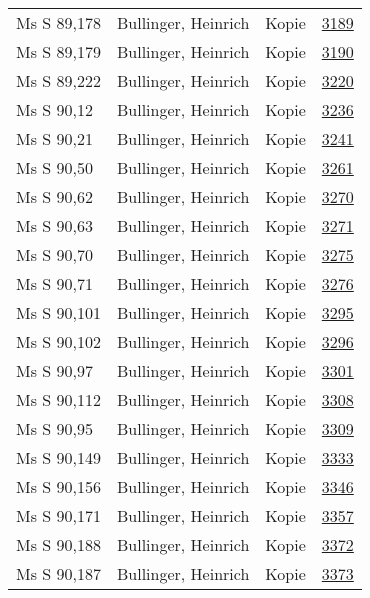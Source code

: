 \documentclass[10pt,a4paper,landscape]{report}
\begin{document}
\begin{longtable}{p{16cm}p{4cm}lr}
Ms S 89,178	&	Bullinger, Heinrich	&	Kopie	&	\href{http://130.60.24.72/assignment/3189}{3189}\\
Ms S 89,179	&	Bullinger, Heinrich	&	Kopie	&	\href{http://130.60.24.72/assignment/3190}{3190}\\
Ms S 89,222	&	Bullinger, Heinrich	&	Kopie	&	\href{http://130.60.24.72/assignment/3220}{3220}\\
Ms S 90,12	&	Bullinger, Heinrich	&	Kopie	&	\href{http://130.60.24.72/assignment/3236}{3236}\\
Ms S 90,21	&	Bullinger, Heinrich	&	Kopie	&	\href{http://130.60.24.72/assignment/3241}{3241}\\
Ms S 90,50	&	Bullinger, Heinrich	&	Kopie	&	\href{http://130.60.24.72/assignment/3261}{3261}\\
Ms S 90,62	&	Bullinger, Heinrich	&	Kopie	&	\href{http://130.60.24.72/assignment/3270}{3270}\\
Ms S 90,63	&	Bullinger, Heinrich	&	Kopie	&	\href{http://130.60.24.72/assignment/3271}{3271}\\
Ms S 90,70	&	Bullinger, Heinrich	&	Kopie	&	\href{http://130.60.24.72/assignment/3275}{3275}\\
Ms S 90,71	&	Bullinger, Heinrich	&	Kopie	&	\href{http://130.60.24.72/assignment/3276}{3276}\\
Ms S 90,101	&	Bullinger, Heinrich	&	Kopie	&	\href{http://130.60.24.72/assignment/3295}{3295}\\
Ms S 90,102	&	Bullinger, Heinrich	&	Kopie	&	\href{http://130.60.24.72/assignment/3296}{3296}\\
Ms S 90,97	&	Bullinger, Heinrich	&	Kopie	&	\href{http://130.60.24.72/assignment/3301}{3301}\\
Ms S 90,112	&	Bullinger, Heinrich	&	Kopie	&	\href{http://130.60.24.72/assignment/3308}{3308}\\
Ms S 90,95	&	Bullinger, Heinrich	&	Kopie	&	\href{http://130.60.24.72/assignment/3309}{3309}\\
Ms S 90,149	&	Bullinger, Heinrich	&	Kopie	&	\href{http://130.60.24.72/assignment/3333}{3333}\\
Ms S 90,156	&	Bullinger, Heinrich	&	Kopie	&	\href{http://130.60.24.72/assignment/3346}{3346}\\
Ms S 90,171	&	Bullinger, Heinrich	&	Kopie	&	\href{http://130.60.24.72/assignment/3357}{3357}\\
Ms S 90,188	&	Bullinger, Heinrich	&	Kopie	&	\href{http://130.60.24.72/assignment/3372}{3372}\\
Ms S 90,187	&	Bullinger, Heinrich	&	Kopie	&	\href{http://130.60.24.72/assignment/3373}{3373}\\

\end{longtable}
\end{document}
